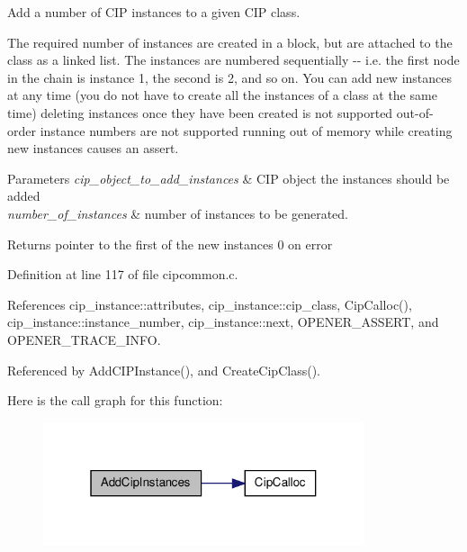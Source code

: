 \-Add a number of \-C\-I\-P instances to a given \-C\-I\-P class. 

\-The required number of instances are created in a block, but are attached to the class as a linked list. \-The instances are numbered sequentially -\/-\/ i.\-e. the first node in the chain is instance 1, the second is 2, and so on. \-You can add new instances at any time (you do not have to create all the instances of a class at the same time) deleting instances once they have been created is not supported out-\/of-\/order instance numbers are not supported running out of memory while creating new instances causes an assert.


\begin{DoxyParams}{\-Parameters}
{\em cip\-\_\-object\-\_\-to\-\_\-add\-\_\-instances} & \-C\-I\-P object the instances should be added \\
\hline
{\em number\-\_\-of\-\_\-instances} & number of instances to be generated. \\
\hline
\end{DoxyParams}
\begin{DoxyReturn}{\-Returns}
pointer to the first of the new instances 0 on error 
\end{DoxyReturn}


\-Definition at line 117 of file cipcommon.\-c.



\-References cip\-\_\-instance\-::attributes, cip\-\_\-instance\-::cip\-\_\-class, \-Cip\-Calloc(), cip\-\_\-instance\-::instance\-\_\-number, cip\-\_\-instance\-::next, \-O\-P\-E\-N\-E\-R\-\_\-\-A\-S\-S\-E\-R\-T, and \-O\-P\-E\-N\-E\-R\-\_\-\-T\-R\-A\-C\-E\-\_\-\-I\-N\-F\-O.



\-Referenced by \-Add\-C\-I\-P\-Instance(), and \-Create\-Cip\-Class().



\-Here is the call graph for this function\-:
\nopagebreak
\begin{figure}[H]
\begin{center}
\leavevmode
\includegraphics[width=268pt]{d2/dc9/group__CIP__API_ga39dafca98f844a12511af11b1273d0a8_cgraph}
\end{center}
\end{figure}




